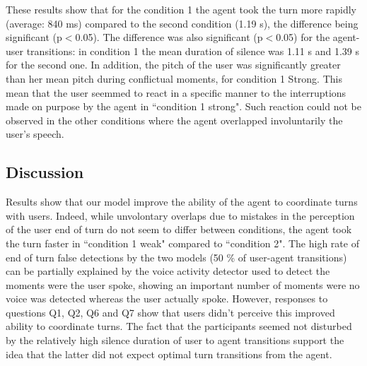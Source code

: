 These results show that for the condition 1 the agent took the turn more rapidly (average: 840 ms) compared to the second condition (1.19 s), the difference being significant (p$<$0.05). The difference was also significant (p$<$0.05) for the agent-user transitions: in condition 1 the mean duration of silence was 1.11 s and 1.39 s for the second one. 
In addition, the pitch of the user was significantly greater than her mean pitch during conflictual moments, for condition 1 Strong. This mean that the user seemmed to react in a specific manner to the interruptions made on purpose by the agent in ``condition 1 strong". Such reaction could not be observed in the other conditions where the agent overlapped involuntarily the user's speech.



\subsection{Discussion}

Results show that our model improve the ability of the agent to coordinate turns with users. Indeed, while unvolontary overlaps due to mistakes in the perception of the user end of turn do not seem to differ between conditions, the agent took the turn faster in ``condition 1 weak" compared to ``condition 2". The high rate of end of turn false detections by the two models (50 \% of user-agent transitions) can be partially explained by the voice activity detector used to detect the moments were the user spoke, showing an important number of moments were no voice was detected whereas the user actually spoke. 
However, responses to questions Q1, Q2, Q6 and Q7 show that users didn't perceive this improved ability to coordinate turns. The fact that the participants seemed not disturbed by the relatively high silence duration of user to agent transitions support the idea that the latter did not expect optimal turn transitions from the agent.

